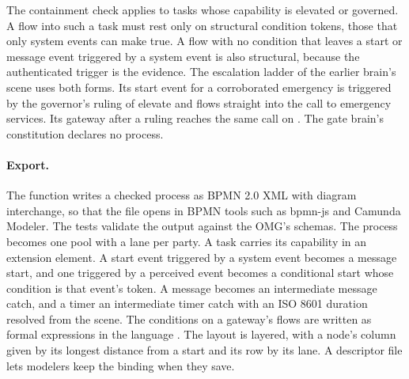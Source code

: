 The containment check applies to tasks whose capability is elevated or governed. A flow into such a
task must rest only on structural condition tokens, those that only system events can make true.
A flow with no condition that leaves a start or message event triggered by a system event is also
structural, because the authenticated trigger is the evidence. The escalation ladder of the
earlier brain's scene uses both
forms. Its start event for a corroborated emergency is triggered by the governor's ruling of elevate
and flows straight into the call to emergency services. Its gateway after a ruling reaches the same
call on . The gate
brain's constitution declares no process.

\paragraph{Export.}
The function  writes a checked process as BPMN 2.0 XML \cite{omg2011bpmn} with diagram
interchange, so that the file opens in BPMN tools such as bpmn-js and Camunda Modeler. The tests
validate the output against the OMG's schemas. The process becomes one pool with a lane per party. A
task carries its capability in an  extension element. A start event triggered by
a system event becomes a message start, and one triggered by a perceived event becomes a
conditional start whose condition is that event's token. A message becomes an intermediate message
catch, and a timer an intermediate timer catch with an ISO 8601 duration resolved from the scene. The
conditions on a gateway's flows are written as formal expressions in the language
. The layout is layered, with a node's column given by its
longest distance from a start and its row by its lane. A descriptor file lets modelers keep the
binding when they save.

